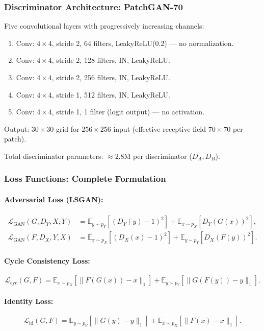 \documentclass[conference]{IEEEtran}
\begin{document}
\subsubsection{Discriminator Architecture: PatchGAN-70}
Five convolutional layers with progressively increasing channels:
\begin{enumerate}
\item Conv: $4 \times 4$, stride 2, 64 filters, LeakyReLU(0.2) — no normalization.
\item Conv: $4 \times 4$, stride 2, 128 filters, IN, LeakyReLU.
\item Conv: $4 \times 4$, stride 2, 256 filters, IN, LeakyReLU.
\item Conv: $4 \times 4$, stride 1, 512 filters, IN, LeakyReLU.
\item Conv: $4 \times 4$, stride 1, 1 filter (logit output) — no activation.
\end{enumerate}
Output: $30 \times 30$ grid for $256 \times 256$ input (effective receptive field $70 \times 70$ per patch).

Total discriminator parameters: $\approx 2.8$M per discriminator ($D_A, D_B$).

\subsubsection{Loss Functions: Complete Formulation}
\paragraph{Adversarial Loss (LSGAN):}
\begin{align}
\mathcal{L}_{\text{GAN}}(G, D_Y, X, Y) &= \mathbb{E}_{y \sim p_Y}[(D_Y(y) - 1)^2] + \mathbb{E}_{x \sim p_X}[D_Y(G(x))^2], \\
\mathcal{L}_{\text{GAN}}(F, D_X, Y, X) &= \mathbb{E}_{x \sim p_X}[(D_X(x) - 1)^2] + \mathbb{E}_{y \sim p_Y}[D_X(F(y))^2].
\end{align}

\paragraph{Cycle Consistency Loss:}
\begin{equation}
\mathcal{L}_{\text{cyc}}(G, F) = \mathbb{E}_{x \sim p_X}[\|F(G(x)) - x\|_1] + \mathbb{E}_{y \sim p_Y}[\|G(F(y)) - y\|_1].
\end{equation}

\paragraph{Identity Loss:}
\begin{equation}
\mathcal{L}_{\text{id}}(G, F) = \mathbb{E}_{y \sim p_Y}[\|G(y) - y\|_1] + \mathbb{E}_{x \sim p_X}[\|F(x) - x\|_1].
\end{equation}
\end{document}
